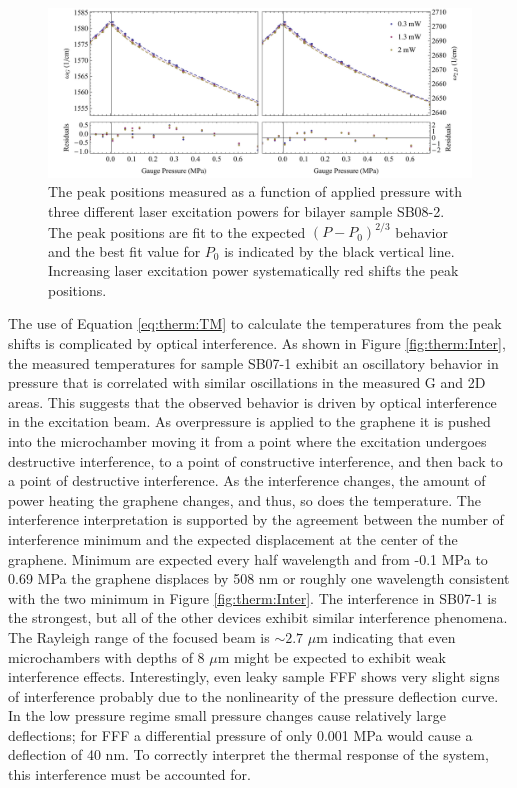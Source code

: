 \begin{figure}
	\begin{center}
	\includegraphics[scale=0.6]{Figs_Thermal/PeakPressure.pdf}
	\end{center}
	\caption[Pressure dependent peak positions]{\label{fig:therm:PeakPressure}
		The peak positions measured as a function of applied pressure with three different laser excitation powers for bilayer sample SB08-2.
		The peak positions are fit to the expected $(P-P_0)^{2/3}$ behavior and the best fit value for $P_0$ is indicated by the black vertical line.
		Increasing laser excitation power systematically red shifts the peak positions.
	}
\end{figure}

The use of Equation \ref{eq:therm:TM} to calculate the temperatures from the peak shifts is complicated by optical interference.
As shown in Figure \ref{fig:therm:Inter}, the measured temperatures for sample SB07-1 exhibit an oscillatory behavior in pressure that is correlated with similar oscillations in the measured G and 2D areas.
This suggests that the observed behavior is driven by optical interference in the excitation beam.
As overpressure is applied to the graphene it is pushed into the microchamber moving it from a point where the excitation undergoes destructive interference, to a point of constructive interference, and then back to a point of destructive interference.
As the interference changes, the amount of power heating the graphene changes, and thus, so does the temperature.
The interference interpretation is supported by the agreement between the number of interference minimum and the expected displacement at the center of the graphene.
Minimum are expected every half wavelength and from -0.1 MPa to 0.69 MPa the graphene displaces by 508 nm or roughly one wavelength consistent with the two minimum in Figure \ref{fig:therm:Inter}.
The interference in SB07-1 is the strongest, but all of the other devices exhibit similar interference phenomena.
The Rayleigh range of the focused beam is $\sim 2.7$ $\mu$m indicating that even microchambers with depths of 8 $\mu$m might be expected to exhibit weak interference effects.
Interestingly, even leaky sample FFF shows very slight signs of interference probably due to the nonlinearity of the pressure deflection curve.
In the low pressure regime small pressure changes cause relatively large deflections; for FFF a differential pressure of only 0.001 MPa would cause a deflection of 40 nm.
To correctly interpret the thermal response of the system, this interference must be accounted for.

